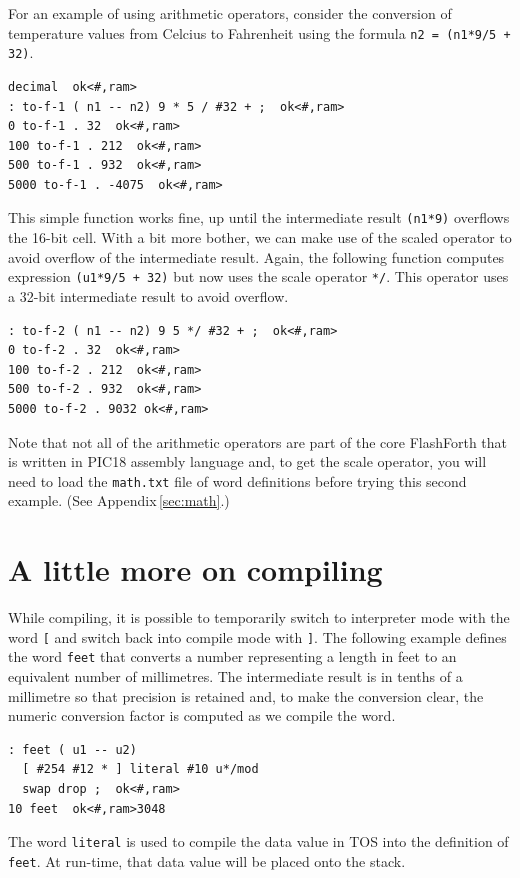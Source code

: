 \documentclass[12pt,a4paper]{article}
\begin{document}
\medskip
For an example of using arithmetic operators, consider the 
conversion of temperature values from Celcius to Fahrenheit 
using the formula \verb!n2 = (n1*9/5 + 32)!.
\begin{verbatim}
decimal  ok<#,ram>
: to-f-1 ( n1 -- n2) 9 * 5 / #32 + ;  ok<#,ram>
0 to-f-1 . 32  ok<#,ram>
100 to-f-1 . 212  ok<#,ram>
500 to-f-1 . 932  ok<#,ram>
5000 to-f-1 . -4075  ok<#,ram>
\end{verbatim}
This simple function works fine, up until the intermediate result
\verb!(n1*9)! overflows the 16-bit cell.
With a bit more bother, we can make use of the scaled operator 
to avoid overflow of the intermediate result.
Again, the following function computes expression \verb!(u1*9/5 + 32)!
but now uses the scale operator \verb!*/!. 
This operator uses a 32-bit intermediate result to avoid overflow.
\begin{verbatim}
: to-f-2 ( n1 -- n2) 9 5 */ #32 + ;  ok<#,ram>
0 to-f-2 . 32  ok<#,ram>
100 to-f-2 . 212  ok<#,ram>
500 to-f-2 . 932  ok<#,ram>
5000 to-f-2 . 9032 ok<#,ram>  
\end{verbatim}
Note that not all of the arithmetic operators are part of the core FlashForth
that is written in PIC18 assembly language and, to get the scale operator,
you will need to load the \verb!math.txt! file of word definitions before
trying this second example.  (See Appendix\,\ref{sec:math}.)

\bigskip
\section{A little more on compiling}
\label{sec:compile-mode}
%
While compiling, it is possible to temporarily switch to interpreter mode
with the word \verb![! and switch back into compile mode with \verb!]!.
The following example defines the word \verb!feet! that converts a number
representing a length in feet to an equivalent number of millimetres.
The intermediate result is in tenths of a millimetre so that precision is retained and,
to make the conversion clear, the numeric conversion factor is computed
as we compile the word.
\begin{verbatim}
: feet ( u1 -- u2) 
  [ #254 #12 * ] literal #10 u*/mod 
  swap drop ;  ok<#,ram>
10 feet  ok<#,ram>3048 
\end{verbatim}
The word \verb!literal! is used to compile the data value in TOS 
into the definition of \verb!feet!.
At run-time, that data value will be placed onto the stack.


\bigskip
\end{document}
